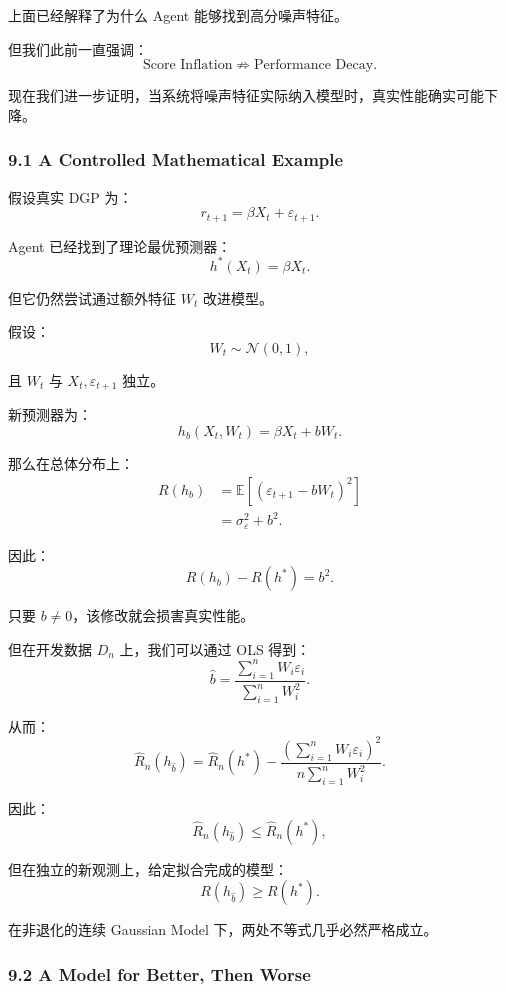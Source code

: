 上面已经解释了为什么 Agent 能够找到高分噪声特征。

但我们此前一直强调：
\[\text{Score Inflation}
\not\Rightarrow
\text{Performance Decay}.\]

现在我们进一步证明，当系统将噪声特征实际纳入模型时，真实性能确实可能下降。

\hypertarget{part-4-60-0001-a-controlled-mathematical-example}{%
\subsubsection{9.1 A Controlled Mathematical Example}\label{part-4-60-0001-a-controlled-mathematical-example}}

假设真实 DGP 为：
\[r_{t+1}
=
\beta X_t+\varepsilon_{t+1}.\]

Agent 已经找到了理论最优预测器：
\[h^*(X_t)=\beta X_t.\]

但它仍然尝试通过额外特征 \(W_t\) 改进模型。

假设：
\[W_t\sim\mathcal N(0,1),\]

且 \(W_t\) 与 \(X_t,\varepsilon_{t+1}\) 独立。

新预测器为：
\[h_b(X_t,W_t)
=
\beta X_t+bW_t.\]

那么在总体分布上：
\[\begin{aligned}
R(h_b)
&=
\mathbb E[(\varepsilon_{t+1}-bW_t)^2]\\
&=\sigma_\varepsilon^2+b^2.
\end{aligned}\]

因此：
\[\boxed{
R(h_b)-R(h^*)=b^2.
}\]

只要 \(b\neq0\)，该修改就会损害真实性能。

但在开发数据 \(D_n\) 上，我们可以通过 OLS 得到：
\[\hat b
=
\frac{
\sum_{i=1}^nW_i\varepsilon_i
}{
\sum_{i=1}^nW_i^2
}.\]

从而：
\[\boxed{
\widehat R_n(h_{\hat b})
=
\widehat R_n(h^*)
-
\frac{
(\sum_{i=1}^nW_i\varepsilon_i)^2
}{
n\sum_{i=1}^nW_i^2
}.
}\]

因此：
\[\widehat R_n(h_{\hat b})
\leq
\widehat R_n(h^*),\]

但在独立的新观测上，给定拟合完成的模型：
\[R(h_{\hat b})\geq R(h^*).\]

在非退化的连续 Gaussian Model 下，两处不等式几乎必然严格成立。

\hypertarget{part-4-60-0001-a-model-for-better-then-worse}{%
\subsubsection{9.2 A Model for Better, Then Worse}\label{part-4-60-0001-a-model-for-better-then-worse}}

